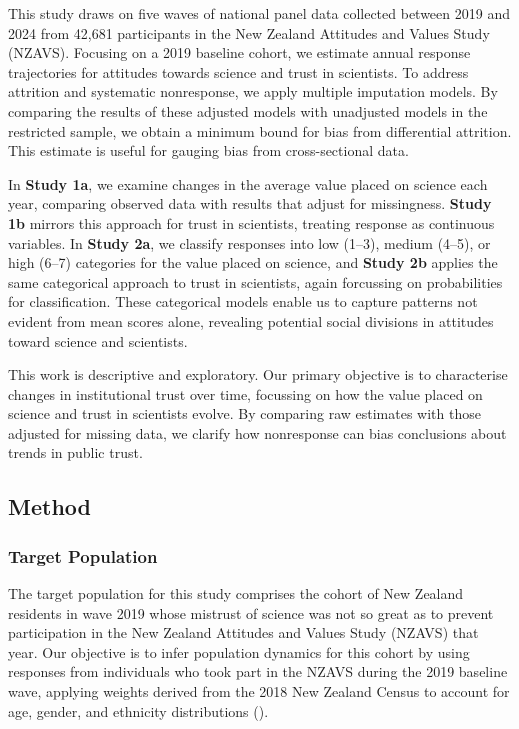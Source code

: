 \documentclass[
  single column]{article}
\begin{document}
This study draws on five waves of national panel data collected between
2019 and 2024 from 42,681 participants in the New Zealand Attitudes and
Values Study (NZAVS). Focusing on a 2019 baseline cohort, we estimate
annual response trajectories for attitudes towards science and trust in
scientists. To address attrition and systematic nonresponse, we apply
multiple imputation models. By comparing the results of these adjusted
models with unadjusted models in the restricted sample, we obtain a
minimum bound for bias from differential attrition. This estimate is
useful for gauging bias from cross-sectional data.

In \textbf{Study 1a}, we examine changes in the average value placed on
science each year, comparing observed data with results that adjust for
missingness. \textbf{Study 1b} mirrors this approach for trust in
scientists, treating response as continuous variables. In \textbf{Study
2a}, we classify responses into low (1--3), medium (4--5), or high
(6--7) categories for the value placed on science, and \textbf{Study 2b}
applies the same categorical approach to trust in scientists, again
forcussing on probabilities for classification. These categorical models
enable us to capture patterns not evident from mean scores alone,
revealing potential social divisions in attitudes toward science and
scientists.

This work is descriptive and exploratory. Our primary objective is to
characterise changes in institutional trust over time, focussing on how
the value placed on science and trust in scientists evolve. By comparing
raw estimates with those adjusted for missing data, we clarify how
nonresponse can bias conclusions about trends in public trust.

\subsection{Method}\label{method}

\subsubsection{Target Population}\label{target-population}

The target population for this study comprises the cohort of New Zealand
residents in wave 2019 whose mistrust of science was not so great as to
prevent participation in the New Zealand Attitudes and Values Study
(NZAVS) that year. Our objective is to infer population dynamics for
this cohort by using responses from individuals who took part in the
NZAVS during the 2019 baseline wave, applying weights derived from the
2018 New Zealand Census to account for age, gender, and ethnicity
distributions ().
\end{document}
